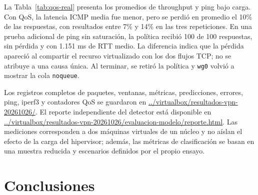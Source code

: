 \documentclass[conference]{IEEEtran}
\begin{document}
La Tabla~\ref{tab:qos-real} presenta los promedios de throughput y ping bajo carga. Con QoS, la latencia ICMP media fue menor, pero se perdió en promedio el 10\% de las respuestas, con resultados entre 7\% y 14\% en las tres repeticiones. En una prueba adicional de ping sin saturación, la política recibió 100 de 100 respuestas, sin pérdida y con 1.151 ms de RTT medio. La diferencia indica que la pérdida apareció al compartir el recurso virtualizado con los dos flujos TCP; no se atribuye a una causa única. Al terminar, se retiró la política y \texttt{wg0} volvió a mostrar la cola \texttt{noqueue}.

\begin{table}[H]
\caption{Throughput y latencia ICMP, promedio de tres repeticiones}
\label{tab:qos-real}
\centering
\scriptsize
{}
\end{table}

Los registros completos de paquetes, ventanas, métricas, predicciones, errores, ping, iperf3 y contadores QoS se guardaron en \url{../virtualbox/resultados-vpn-20261026/}. El reporte independiente del detector está disponible en \url{../virtualbox/resultados-vpn-20261026/evaluacion-modelo/reporte.html}. Las mediciones corresponden a dos máquinas virtuales de un núcleo y no aíslan el efecto de la carga del hipervisor; además, las métricas de clasificación se basan en una muestra reducida y escenarios definidos por el propio ensayo.

\FloatBarrier
\section{Conclusiones}
\end{document}
